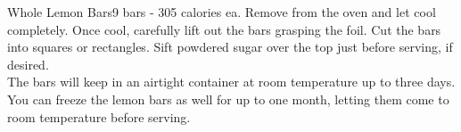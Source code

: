 \begin{recipe}{Whole Lemon Bars}{9 bars - 305 calories ea.}{}
Remove from the oven and let cool completely. Once cool, carefully lift out the bars grasping the foil. Cut the bars into squares or rectangles. Sift powdered sugar over the top just before serving, if desired.\\

The bars will keep in an airtight container at room temperature up to three days. You can freeze the lemon bars as well for up to one month, letting them come to room temperature before serving.

\end{recipe}